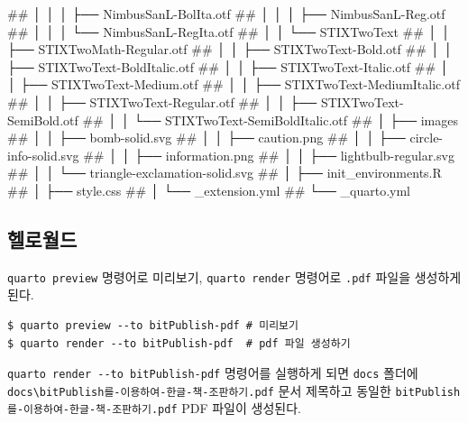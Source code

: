 \documentclass[
  letterpaper,
]{book}
\newenvironment{Shaded}{\begin{snugshade}}{\end{snugshade}}
\newcommand{\CommentTok}[1]{\textcolor[rgb]{0.37,0.37,0.37}{#1}}
\begin{document}
\begin{Shaded}
\begin{Highlighting}[]
\CommentTok{\#\# │           │   │   ├── NimbusSanL{-}BolIta.otf}
\CommentTok{\#\# │           │   │   ├── NimbusSanL{-}Reg.otf}
\CommentTok{\#\# │           │   │   └── NimbusSanL{-}RegIta.otf}
\CommentTok{\#\# │           │   └── STIXTwoText}
\CommentTok{\#\# │           │       ├── STIXTwoMath{-}Regular.otf}
\CommentTok{\#\# │           │       ├── STIXTwoText{-}Bold.otf}
\CommentTok{\#\# │           │       ├── STIXTwoText{-}BoldItalic.otf}
\CommentTok{\#\# │           │       ├── STIXTwoText{-}Italic.otf}
\CommentTok{\#\# │           │       ├── STIXTwoText{-}Medium.otf}
\CommentTok{\#\# │           │       ├── STIXTwoText{-}MediumItalic.otf}
\CommentTok{\#\# │           │       ├── STIXTwoText{-}Regular.otf}
\CommentTok{\#\# │           │       ├── STIXTwoText{-}SemiBold.otf}
\CommentTok{\#\# │           │       └── STIXTwoText{-}SemiBoldItalic.otf}
\CommentTok{\#\# │           ├── images}
\CommentTok{\#\# │           │   ├── bomb{-}solid.svg}
\CommentTok{\#\# │           │   ├── caution.png}
\CommentTok{\#\# │           │   ├── circle{-}info{-}solid.svg}
\CommentTok{\#\# │           │   ├── information.png}
\CommentTok{\#\# │           │   ├── lightbulb{-}regular.svg}
\CommentTok{\#\# │           │   └── triangle{-}exclamation{-}solid.svg}
\CommentTok{\#\# │           ├── init\_environments.R}
\CommentTok{\#\# │           ├── style.css}
\CommentTok{\#\# │           └── \_extension.yml}
\CommentTok{\#\# └── \_quarto.yml}
\end{Highlighting}
\end{Shaded}

\hypertarget{uxd5ecuxb85cuxc6d4uxb4dc-1}{%
\subsection{헬로월드}\label{uxd5ecuxb85cuxc6d4uxb4dc-1}}

\texttt{quarto\ preview} 명령어로 미리보기, \texttt{quarto\ render}
명령어로 \texttt{.pdf} 파일을 생성하게 된다.

\begin{verbatim}
$ quarto preview --to bitPublish-pdf # 미리보기 
$ quarto render --to bitPublish-pdf  # pdf 파일 생성하기
\end{verbatim}

\texttt{quarto\ render\ -\/-to\ bitPublish-pdf} 명령어를 실행하게 되면
\texttt{docs} 폴더에
\texttt{docs\textbackslash{}bitPublish를-이용하여-한글-책-조판하기.pdf}
문서 제목하고 동일한 \texttt{bitPublish를-이용하여-한글-책-조판하기.pdf}
PDF 파일이 생성된다.
\end{document}
